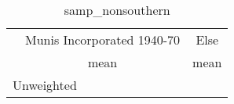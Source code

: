 \begin{table}[htbp]\centering
\def\sym#1{\ifmmode^{#1}\else\(^{#1}\)\fi}
\caption{samp\_nonsouthern \label{tab1}}
\begin{tabular}{l*{2}{c}}
\toprule
                    &\multicolumn{1}{c}{Munis Incorporated 1940-70}&\multicolumn{1}{c}{Else}\\
                    &        mean&        mean\\
\midrule
\bottomrule
\multicolumn{3}{l}{\footnotesize Unweighted}\\
\end{tabular}
\end{table}
